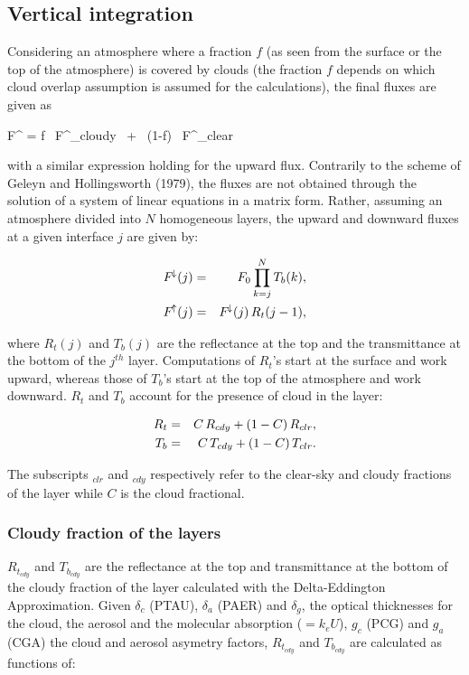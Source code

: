%
\subsection{Vertical integration}
%

Considering an atmosphere where a fraction $f$ (as seen from the surface or the top of the atmosphere) is covered by clouds (the fraction $f$ depends on which cloud overlap assumption is assumed for the calculations), the final fluxes are given as

\medskip
\be
F^{\!\downarrow} = f \, F^{\!\downarrow}_{cloudy} \, + \, (1-f) \, F^{\!\downarrow}_{clear}
\label{ecmwf3110}
\ee
\medskip

\noindent with a similar expression holding for the upward flux. Contrarily to
the scheme of Geleyn and Hollingsworth (1979), the fluxes are not obtained
through the solution of a system of linear equations in a matrix form. Rather,
assuming an atmosphere divided into $N$ homogeneous layers, the upward and
downward fluxes at a given interface $j$ are given by:

\medskip
\begin{eqnarray}\label{ecmwf312}
F^{\!\downarrow}(j)&=&  F_0 \prod_{k=j}^N{T_b(k)}, \cr
F^{\!\uparrow}(j)  &=&  F^{\!\downarrow}(j) \, R_t(j-1),
\end{eqnarray}
\medskip

\noindent where $R_t(j)$ and $T_b(j)$ are the reflectance at the top and the
transmittance at the bottom of the $j^{th}$ layer. Computations of $R_t$'s
start at the surface and work upward, whereas those of $T_b$'s start at the top
of the atmosphere and work downward. $R_t$ and $T_b$ account for the presence of
cloud in the layer:

\medskip
\begin{eqnarray}\label{ecmwf313}
R_t &=& C \, R_{cdy} + (1 - C) \, R_{clr}, \cr
T_b &=& C \, T_{cdy} + (1 - C) \, T_{clr}.
\end{eqnarray}
\medskip

The subscripts $_{clr}$ and $_{cdy}$ respectively refer to the clear-sky and
cloudy fractions of the layer while $C$ is the cloud fractional.\\


%
\subsubsection{Cloudy fraction of the layers}
\label{subsubsection321}
%

$R_{t_{cdy}}$ and $T_{b_{cdy}}$ are the reflectance at the top and transmittance
at the bottom of the cloudy fraction of the layer calculated with the
Delta-Eddington Approximation. Given $\delta_c$ (PTAU), $\delta_a$ (PAER) and
$\delta_g$, the optical thicknesses for the cloud, the aerosol and the molecular
absorption ($= k_e U$), $g_c$ (PCG) and $g_a$ (CGA) the cloud and aerosol
asymetry factors, $R_{t_{cdy}}$ and $T_{b_{cdy}}$ are calculated as functions of:

